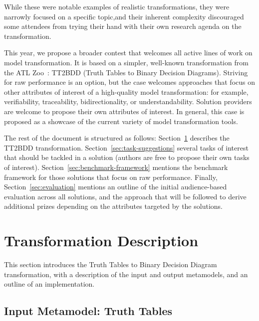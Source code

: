 \documentclass[a4paper]{scrartcl}
\begin{document}
While these were notable examples of realistic transformations, they were
narrowly focused on a specific topic,and their inherent complexity discouraged
some attendees from trying their hand with their own research agenda on the
transformation.

This year, we propose a broader contest that welcomes all active lines of work
on model transformation. It is based on a simpler, well-known transformation
from the ATL Zoo~\cite{atlzoo}: TT2BDD (Truth Tables to Binary Decision
Diagrams). Striving for raw performance is an option, but the case welcomes
approaches that focus on other attributes of interest of a high-quality model
transformation: for example, verifiability, traceability, bidirectionality, or
understandability. Solution providers are welcome to propose their own
attributes of interest. In general, this case is proposed as a showcase of the
current variety of model transformation tools.

The rest of the document is structured as follows:
Section~\ref{sec:transf-descr} describes the TT2BDD transformation.
Section~\ref{sec:task-suggestions} several tasks of interest that
should be tackled in a solution (authors are free to propose their own tasks of
interest). Section~\ref{sec:benchmark-framework} mentions the benchmark
framework for those solutions that focus on raw performance. Finally,
Section~\ref{sec:evaluation} mentions an outline of the initial audience-based
evaluation across all solutions, and the approach that will be followed to
derive additional prizes depending on the attributes targeted by the solutions.

\section{Transformation Description}
\label{sec:transf-descr}

This section introduces the Truth Tables to Binary Decision Diagram
transformation, with a description of the input and output metamodels, and an
outline of an implementation.

\subsection{Input Metamodel: Truth Tables}
\label{sec:input-metam-truth}
\end{document}
